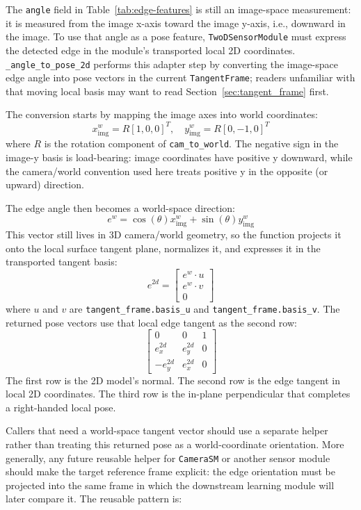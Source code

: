 \documentclass{article}
\begin{document}
The \texttt{angle} field in Table~\ref{tab:edge-features} is still an image-space measurement: it is measured from the image x-axis toward the image y-axis, i.e., downward in the image.
To use that angle as a pose feature, \texttt{TwoDSensorModule} must express the detected edge in the module's transported local 2D coordinates.
\texttt{\_angle\_to\_pose\_2d} performs this adapter step by converting the image-space edge angle into pose vectors in the current \texttt{TangentFrame}; readers unfamiliar with that moving local basis may want to read Section~\ref{sec:tangent_frame} first.

The conversion starts by mapping the image axes into world coordinates:
\[
  x_{\mathrm{img}}^{w} = R[1, 0, 0]^T,
  \quad
  y_{\mathrm{img}}^{w} = R[0, -1, 0]^T
\]
where $R$ is the rotation component of \texttt{cam\_to\_world}.
The negative sign in the image-y basis is load-bearing: image coordinates have positive y downward, while the camera/world convention used here treats positive y in the opposite (or upward) direction.

The edge angle then becomes a world-space direction:
\[
  e^w =
    \cos(\theta) x_{\mathrm{img}}^{w}
    + \sin(\theta) y_{\mathrm{img}}^{w}
\]
This vector still lives in 3D camera/world geometry, so the function projects it onto the local surface tangent plane, normalizes it, and expresses it in the transported tangent basis:
\[
  e^{2d} =
  \begin{bmatrix}
    e^w \cdot u \\
    e^w \cdot v \\
    0
  \end{bmatrix}
\]
where $u$ and $v$ are \texttt{tangent\_frame.basis\_u} and \texttt{tangent\_frame.basis\_v}.
The returned pose vectors use that local edge tangent as the second row:
\[
  \begin{bmatrix}
    0 & 0 & 1 \\
    e_x^{2d} & e_y^{2d} & 0 \\
    -e_y^{2d} & e_x^{2d} & 0
  \end{bmatrix}
\]
The first row is the 2D model's normal.
The second row is the edge tangent in local 2D coordinates.
The third row is the in-plane perpendicular that completes a right-handed local pose.

Callers that need a world-space tangent vector should use a separate helper rather than treating this returned pose as a world-coordinate orientation.
More generally, any future reusable helper for \texttt{CameraSM} or another sensor module should make the target reference frame explicit: the edge orientation must be projected into the same frame in which the downstream learning module will later compare it.
The reusable pattern is:
\end{document}
